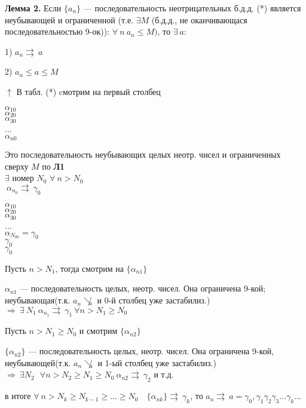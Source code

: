 \documentclass{article}
\begin{document}
    \textbf{Лемма 2.} Если \( \{a_n\} \) --- последовательность неотрицательных б.д.д. (*) является неубывающей и ограниченной (т.е. \( \exists M \) (б.д.д., не оканчивающася последовательностью 9-ок)): \( \forall\ n\ a_n \leq M) \), то \( \exists\ a \):
    
    1) \(a_n \rightrightarrows\ a\)  

    2) \(a_n \leq a \leq M\)

    \( \uparrow \) В табл. (*) cмотрим на первый столбец

    \( \alpha_{10} \)\\
    \( \alpha_{20} \)\\
    \( \alpha_{30} \)\\
    ...\\
    \( \alpha_{n0} \)

    Это последовательность неубывающих целых неотр. чисел и ограниченных сверху \(M\) по \textbf{Л1}\\
    \(\exists \) номер \(N_0\) \: \(\forall\ n > N_0\)\\
    \(\ \alpha_{n_0} \rightrightarrows\ \gamma_0\)
    
    \( \alpha_{10} \)\\
    \( \alpha_{20} \)\\
    \( \alpha_{30} \)\\
    ...\\
    \( \alpha_{N_00} = \gamma_0 \)\\
    \(\gamma_0\)\\
    \(\gamma_0\)

    Пусть \(n > N_1\), тогда смотрим на \(\{\alpha_{n1}\}\)

    \(\alpha_{n1}\) --- последовательность целых, неотр. чисел. Она ограничена 9-кой; неубывающая(т.к. \(a_n \not\searrow\) и 0-й столбец уже застабилиз.) \(\Rightarrow \ \exists\ N_1 \ \alpha_{n_1} \rightrightarrows\ \gamma_1 \ \forall n > N_1 \geq N_0\)

    Пусть \( n > N_1 \geq N_0 \) и смотрим \( \{ \alpha_{n2} \} \)
    
    \(\{\alpha_{n2}\}\) --- последовательность целых, неотр. чисел. Она ограничена 9-кой, неубывающей(т.к. \(a_n \not\searrow\) и 1-ый столбец уже застабилиз.) \(\Rightarrow \ \exists N_2 \ \: \ \forall n > N_2 \geq N_1 \geq N_0 \ \alpha_{n2} \rightrightarrows\ \gamma_2\) и т.д.

    в итоге \( \forall\ n > N_k \geq N_{k-1} \geq ... \geq N_0\quad \{ \alpha_{nk} \} \rightrightarrows\ \gamma_k \), то \( a_n \rightrightarrows\ a = \gamma_0,\gamma_1\gamma_2\gamma_3...\gamma_k... \)
    
\end{document}
